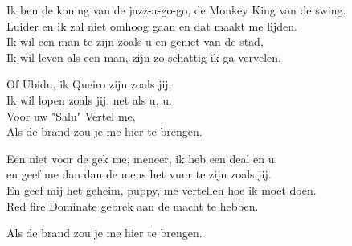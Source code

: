 \clearpage
\begin{translation}
Ik ben de koning van de jazz-a-go-go, de Monkey King van de swing.\\
Luider en ik zal niet omhoog gaan en dat maakt me lijden.\\
Ik wil een man te zijn zoals u en geniet van de stad,\\
Ik wil leven als een man, zijn zo schattig ik ga vervelen.\vspace{\wlskip}
 
Of Ubidu, ik Queiro zijn zoals jij,\\
Ik wil lopen zoals jij, net als u, u.\\
Voor uw "Salu" Vertel me,\\
Als de brand zou je me hier te brengen.\vspace{\wlskip}
 
Een niet voor de gek me, meneer, ik heb een deal en u.\\
en geef me dan dan de mens het vuur te zijn zoals jij.\\
En geef mij het geheim, puppy, me vertellen hoe ik moet doen.\\
Red fire Dominate gebrek aan de macht te hebben.\vspace{\wlskip}
 
Als de brand zou je me hier te brengen.
\end{translation}
